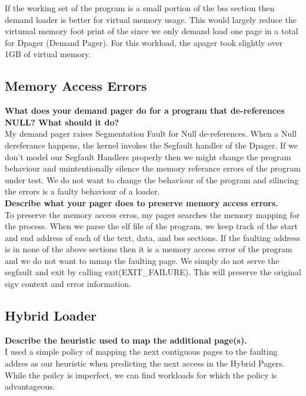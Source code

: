 \documentclass{article}
\begin{document}
If the working set of the program is a small portion of the bss section then demand loader is better for 
virtual memory usage. This would largely reduce the virtumal memory foot print of the since we only demand 
load one page in a total for Dpager (Demand Pager). For this workload, the apager took slightly over 1GB of virtual memory. \\

\subsection{Memory Access Errors}

\textbf{What does your demand pager do for a program that de-references NULL? What should it do?}\\

My demand pager raises Segmentation Fault for Null de-references. When a Null dereferance happens, the kernel 
invokes the Segfault handler of the Dpager. If we don't model our Segfault Handlers properly then we might 
change the program behaviour and unintentionally silence the memory referance errors of the program under 
test. We do not want to change the behaviour of the program and silincing the errors is a faulty behaviour 
of a loader.\\

\textbf{Describe what your pager does to preserve memory access errors.}\\

To preserve the memory access erros, my pager searches the memory mapping for the process. When we parse 
the elf file of the program, we keep track of the start and end address of each of the text, data, and bss 
sections. If the faulting address is in none of the above sections then it is a memory access error of the 
program and we do not want to mmap the faulting page. We simply do not serve the segfault and exit by calling
exit(EXIT\_FAILURE). This will preserve the original sigv context and error information.\\

\subsection{Hybrid Loader}

\textbf{Describe the heuristic used to map the additional page(s).}\\

I used a simple policy of mapping the next contiguous pages to the faulting addres as our heuristic
when predicting the next access in the Hybrid Pagers. 
While the poilcy is imperfect, we can find workloads for which the policy is advantageous.\\
\end{document}
